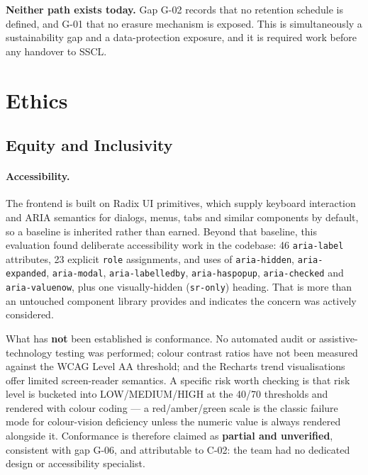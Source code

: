 \textbf{Neither path exists today.} Gap G-02 records that no retention schedule
is defined, and G-01 that no erasure mechanism is exposed. This is
simultaneously a sustainability gap and a data-protection exposure, and it is
required work before any handover to SSCL.

\section{Ethics}
\label{sec:ethics}

\subsection{Equity and Inclusivity}
\label{subsec:equity}

\paragraph{Accessibility.} The frontend is built on Radix UI primitives, which
supply keyboard interaction and ARIA semantics for dialogs, menus, tabs and
similar components by default, so a baseline is inherited rather than earned.
Beyond that baseline, this evaluation found deliberate accessibility work in the
codebase: 46 \texttt{aria-label} attributes, 23 explicit \texttt{role}
assignments, and uses of \texttt{aria-hidden}, \texttt{aria-expanded},
\texttt{aria-modal}, \texttt{aria-labelledby}, \texttt{aria-haspopup},
\texttt{aria-checked} and \texttt{aria-valuenow}, plus one visually-hidden
(\texttt{sr-only}) heading. That is more than an untouched component library
provides and indicates the concern was actively considered.

What has \textbf{not} been established is conformance. No automated audit or
assistive-technology testing was performed; colour contrast ratios have not been
measured against the WCAG Level AA threshold; and the Recharts trend
visualisations offer limited screen-reader semantics. A specific risk worth
checking is that risk level is bucketed into LOW/MEDIUM/HIGH at the 40/70
thresholds and rendered with colour coding --- a red/amber/green scale is the
classic failure mode for colour-vision deficiency unless the numeric value is
always rendered alongside it. Conformance is therefore claimed as
\textbf{partial and unverified}, consistent with gap G-06, and attributable to
C-02: the team had no dedicated design or accessibility specialist.

